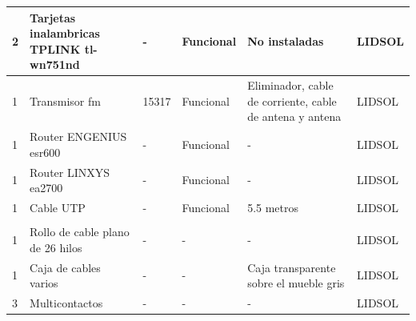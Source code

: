 \documentclass[a4paper,11pt]{article}                 %
\begin{document}
\begin{longtable}{|p{}|p{}|p{}|p{}|p{}|p{}|}
2                          & Tarjetas inalambricas TPLINK tl-wn751nd & -                                                                            & Funcional                & No instaladas                                            & LIDSOL                        \\ \hline
1                          & Transmisor fm                           & 15317                                                                        & Funcional                & Eliminador, cable de corriente, cable de antena y antena & LIDSOL                        \\ \hline
1                          & Router ENGENIUS esr600                  & -                                                                            & Funcional                & -                                                        & LIDSOL                        \\ \hline
1                          & Router LINXYS ea2700                    & -                                                                            & Funcional                & -                                                        & LIDSOL                        \\ \hline
1                          & Cable UTP                               & -                                                                            & Funcional                & 5.5 metros                                               & LIDSOL                        \\ \hline
\multicolumn{6}{|l|}{\cellcolor[HTML]{EFEFEF}{\color[HTML]{343434} Cables}}                                                                                                                                                                      \\ \hline
1                          & Rollo de cable plano de 26 hilos & -                                                                            & -                        & -                                      & LIDSOL                        \\ \hline
1                          & Caja de cables varios            & -                                                                            & -                        & Caja transparente sobre el mueble gris & LIDSOL                        \\ \hline
3                          & Multicontactos                   & -                                                                            & -                        & -                                      & LIDSOL                        \\ \hline

\end{longtable}
\end{document}
